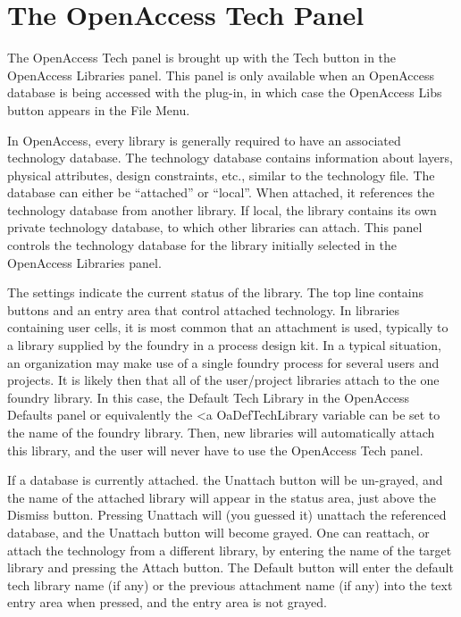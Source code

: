 \section{The {\cb OpenAccess Tech} Panel}
\label{oatech}

The {\cb OpenAccess Tech} panel is brought up with the {\cb Tech}
button in the {\cb OpenAccess Libraries} panel.  This panel is only
available when an OpenAccess database is being accessed with the
plug-in, in which case the {\cb OpenAccess Libs} button appears in the
{\cb File Menu}.

In OpenAccess, every library is generally required to have an
associated technology database.  The technology database contains
information about layers, physical attributes, design constraints,
etc., similar to the {\Xic} technology file.  The database can either
be ``attached'' or ``local''.  When attached, it references the
technology database from another library.  If local, the library
contains its own private technology database, to which other libraries
can attach.  This panel controls the technology database for the
library initially selected in the {\cb OpenAccess Libraries} panel.

The settings indicate the current status of the library.  The top line
contains buttons and an entry area that control attached technology. 
In libraries containing user cells, it is most common that an
attachment is used, typically to a library supplied by the foundry in
a process design kit.  In a typical situation, an organization may
make use of a single foundry process for several users and projects. 
It is likely then that all of the user/project libraries attach to the
one foundry library.  In this case, the {\cb Default Tech Library} in
the {\cb OpenAccess Defaults} panel or equivalently the <a {\et
OaDefTechLibrary} variable can be set to the name of the foundry
library.  Then, new libraries will automatically attach this library,
and the user will never have to use the {\cb OpenAccess Tech} panel.

If a database is currently attached.  the {\cb Unattach} button will
be un-grayed, and the name of the attached library will appear in the
status area, just above the {\cb Dismiss} button.  Pressing {\cb
Unattach} will (you guessed it) unattach the referenced database, and
the {\cb Unattach} button will become grayed.  One can reattach, or
attach the technology from a different library, by entering the name
of the target library and pressing the {\cb Attach} button.  The {\cb
Default} button will enter the default tech library name (if any) or
the previous attachment name (if any) into the text entry area when
pressed, and the entry area is not grayed.

